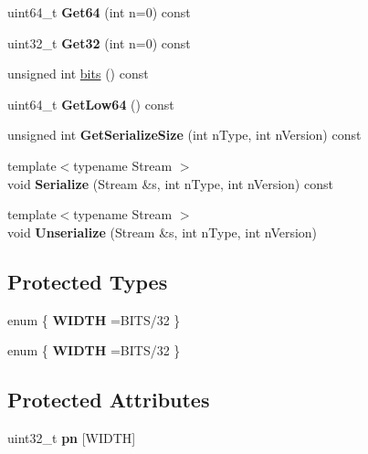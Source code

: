 \begin{DoxyCompactItemize}
uint64\+\_\+t {\bfseries Get64} (int n=0) const
\item 
\mbox{\label{classbase__uint_ac3d25db757d5e8e3328cf35e81c40850}} 
uint32\+\_\+t {\bfseries Get32} (int n=0) const
\item 
unsigned int \mbox{\hyperlink{classbase__uint_afe1eacc0b592cf184ac8ee0446997fbe}{bits}} () const
\item 
\mbox{\label{classbase__uint_ad8dbf3216dd15a64f1598344ad7a71ea}} 
uint64\+\_\+t {\bfseries Get\+Low64} () const
\item 
\mbox{\label{classbase__uint_aa1830b40b57801f1e489adbf4c55ebd9}} 
unsigned int {\bfseries Get\+Serialize\+Size} (int n\+Type, int n\+Version) const
\item 
\mbox{\label{classbase__uint_a2f80cbf71c59275037810824dae9f0d0}} 
{\footnotesize template$<$typename Stream $>$ }\\void {\bfseries Serialize} (Stream \&s, int n\+Type, int n\+Version) const
\item 
\mbox{\label{classbase__uint_adf1ad639d94997a9cda95e0c424ab51a}} 
{\footnotesize template$<$typename Stream $>$ }\\void {\bfseries Unserialize} (Stream \&s, int n\+Type, int n\+Version)
\end{DoxyCompactItemize}
\subsection*{Protected Types}
\begin{DoxyCompactItemize}
\item 
\mbox{\label{classbase__uint_afee51629f03ba95d823ab4ee94cf6c81}} 
enum \{ {\bfseries W\+I\+D\+TH} =B\+I\+T\+S/32
 \}
\item 
\mbox{\label{classbase__uint_aaba8b593f71155630678deb0354beba5}} 
enum \{ {\bfseries W\+I\+D\+TH} =B\+I\+T\+S/32
 \}
\end{DoxyCompactItemize}
\subsection*{Protected Attributes}
\begin{DoxyCompactItemize}
\item 
\mbox{\label{classbase__uint_ab244f5975a20631fe16389124983ba26}} 
uint32\+\_\+t {\bfseries pn} \mbox{[}W\+I\+D\+TH\mbox{]}
\end{DoxyCompactItemize}
